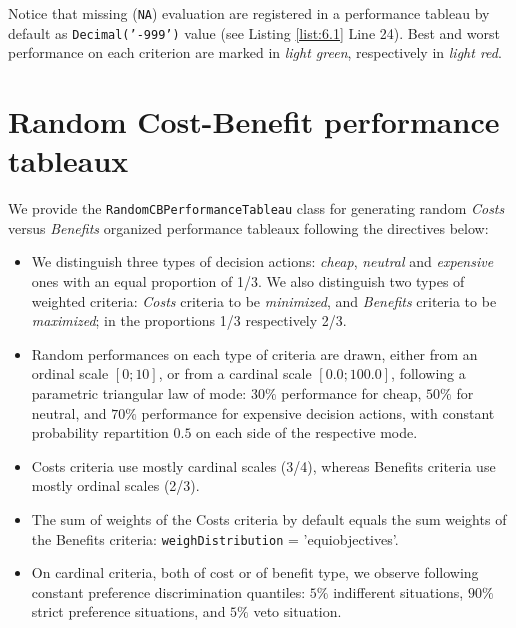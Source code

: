 Notice that missing (\texttt{NA}) evaluation are registered in a performance tableau by default as \texttt{Decimal('-999')} value (see Listing \ref{list:6.1} Line 24). Best and worst performance on each criterion are marked in \emph{light green}, respectively in \emph{light red}.
	    
\section{Random Cost-Benefit performance tableaux}
\label{sec:6.3}

We provide the \texttt{RandomCBPerformanceTableau} class for generating random \emph{Costs} versus \emph{Benefits} organized performance tableaux following the directives below:
\begin{itemize}
\item We distinguish three types of decision actions: \emph{cheap}, \emph{neutral} and \emph{expensive} ones with an equal proportion of 1/3. We also distinguish two types of weighted criteria: \emph{Costs} criteria to be \emph{minimized}, and \emph{Benefits} criteria to be \emph{maximized}; in the proportions 1/3 respectively 2/3. 
\item  Random performances on each type of criteria  are drawn, either from an ordinal scale $[0;10]$, or from a cardinal scale $[0.0;100.0]$, following a parametric triangular law of mode: $30\%$ performance for cheap, $50\%$ for neutral, and $70\%$ performance for expensive decision actions, with constant probability repartition $0.5$ on each side of the respective mode. 
\item Costs criteria use mostly cardinal scales (3/4), whereas Benefits criteria use mostly ordinal scales (2/3). 
\item  The sum of weights of the Costs criteria by default equals the sum weights of the Benefits criteria: \texttt{weighDistribution} = 'equiobjectives'. 
\item On cardinal criteria, both of cost or of benefit type, we observe following constant preference discrimination quantiles: $5\%$ indifferent situations, $90\%$ strict preference situations, and $5\%$ veto situation. 
\end{itemize}

